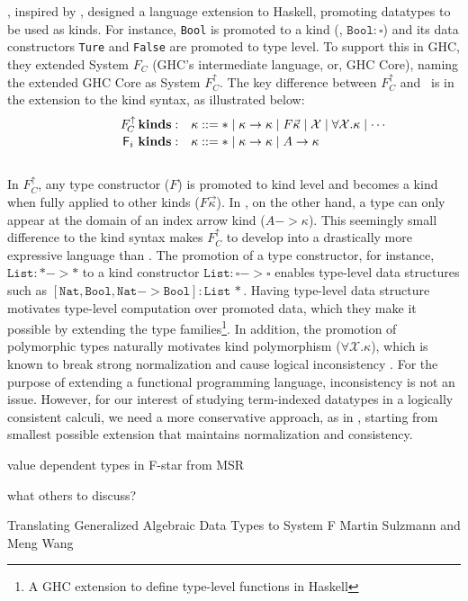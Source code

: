 \citet{YorgeyWCJVM12}, inspired by \citet{SHE}, designed a language extension
to Haskell, promoting datatypes to be used as kinds. For instance, \texttt{Bool}
is promoted to a kind (\ie, $\texttt{Bool}:\square$) and its data constructors
\texttt{Ture} and \texttt{False} are promoted to type level. To support this
in GHC, they extended System $F_{\!C}$ (GHC's intermediate language, or,
GHC Core), naming the extended GHC Core as System $F_{\!C}^\uparrow$.
The key difference between $F_{\!C}^\uparrow$ and \Fi\ is in the extension
to the kind syntax, as illustrated below: \vspace*{-2pt}
\[\qquad\quad
\begin{array}{ll}
F_{\!C}^\uparrow\,\textbf{kinds}: &
\kappa ::= * \mid \kappa -> \kappa \mid F \vec{\kappa} \mid \mathcal{X} \mid \forall \mathcal{X}.\kappa \mid \cdots \\
\,\Fi\,\,\textbf{kinds}: &
\kappa ::= * \mid \kappa -> \kappa \mid A -> \kappa \phantom{A^{A^A}}
\end{array}  
\] ~\vspace*{-6pt}\\
In $F_{\!C}^\uparrow$, any type constructor ($F$) is promoted to 
kind level and becomes a kind when fully applied to other kinds
($F\vec\kappa$). In \Fi, on the other hand, a type can only appear
at the domain of an index arrow kind ($A-> \kappa$). This seemingly small
difference to the kind syntax makes $F_{\!C}^\uparrow$ to develop into
a drastically more expressive language than \Fi. The promotion of
a type constructor, for instance, $\texttt{List}:* -> *$ to a kind constructor
$\texttt{List}:\square-> \square$ enables type-level data structures
such as $\mathtt{[Nat,Bool,Nat-> Bool]:List\,*}$. Having type-level
data structure motivates type-level computation over promoted data,
which they make it possible by extending the type families\footnote{
	A GHC extension to define type-level functions in Haskell}.
In addition, the promotion of polymorphic types naturally motivates
kind polymorphism ($\forall \mathcal{X}.\kappa$), which is known to
break strong normalization and cause logical inconsistency \cite{Girard72}.
For the purpose of extending a functional programming language,
inconsistency is not an issue. However, for our interest of studying
term-indexed datatypes in a logically consistent calculi, we need
a more conservative approach, as in \Fi, starting from smallest possible
extension that maintains normalization and consistency.

\citet{Swamy11}
value dependent types in F-star  from MSR

what others to discuss?

Translating Generalized Algebraic Data Types to System F
Martin Sulzmann and Meng Wang



